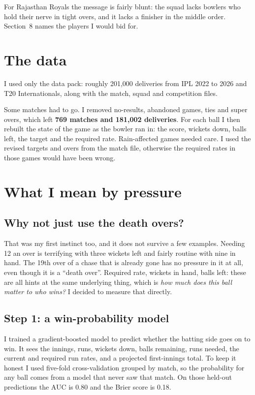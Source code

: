 \documentclass[10.5pt,a4paper]{article}
\begin{document}
For Rajasthan Royals the message is fairly blunt: the squad lacks bowlers who hold their nerve in tight overs, and it lacks a finisher in the middle order. Section~8 names the players I would bid for.

\section{The data}

I used only the data pack: roughly 201,000 deliveries from IPL 2022 to 2026 and T20 Internationals, along with the match, squad and competition files.

Some matches had to go. I removed no-results, abandoned games, ties and super overs, which left \textbf{769 matches and 181,002 deliveries}. For each ball I then rebuilt the state of the game as the bowler ran in: the score, wickets down, balls left, the target and the required rate. Rain-affected games needed care. I used the revised targets and overs from the match file, otherwise the required rates in those games would have been wrong.

\section{What I mean by pressure}

\subsection{Why not just use the death overs?}

That was my first instinct too, and it does not survive a few examples. Needing 12 an over is terrifying with three wickets left and fairly routine with nine in hand. The 19th over of a chase that is already gone has no pressure in it at all, even though it is a ``death over''. Required rate, wickets in hand, balls left: these are all hints at the same underlying thing, which is \emph{how much does this ball matter to who wins?} I decided to measure that directly.

\subsection{Step 1: a win-probability model}

I trained a gradient-boosted model to predict whether the batting side goes on to win. It sees the innings, runs, wickets down, balls remaining, runs needed, the current and required run rates, and a projected first-innings total. To keep it honest I used five-fold cross-validation grouped by match, so the probability for any ball comes from a model that never saw that match. On those held-out predictions the AUC is 0.80 and the Brier score is 0.18.
\end{document}
